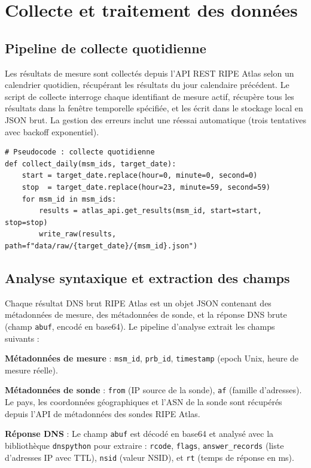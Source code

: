 \bigskip
\section{Collecte et traitement des données}
\label{sec:3.4}

\subsection{Pipeline de collecte quotidienne}
\label{subsec:3.4.1}

Les résultats de mesure sont collectés depuis l'API REST RIPE Atlas selon un calendrier quotidien, récupérant les résultats du jour calendaire précédent. Le script de collecte interroge chaque identifiant de mesure actif, récupère tous les résultats dans la fenêtre temporelle spécifiée, et les écrit dans le stockage local en JSON brut. La gestion des erreurs inclut une réessai automatique (trois tentatives avec backoff exponentiel).

\begin{lstlisting}[style=python]
# Pseudocode : collecte quotidienne
def collect_daily(msm_ids, target_date):
    start = target_date.replace(hour=0, minute=0, second=0)
    stop  = target_date.replace(hour=23, minute=59, second=59)
    for msm_id in msm_ids:
        results = atlas_api.get_results(msm_id, start=start, stop=stop)
        write_raw(results, path=f"data/raw/{target_date}/{msm_id}.json")
\end{lstlisting}

\subsection{Analyse syntaxique et extraction des champs}
\label{subsec:3.4.2}

Chaque résultat DNS brut RIPE Atlas est un objet JSON contenant des métadonnées de mesure, des métadonnées de sonde, et la réponse DNS brute (champ \texttt{abuf}, encodé en base64). Le pipeline d'analyse extrait les champs suivants :

\textbf{Métadonnées de mesure} : \texttt{msm\_id}, \texttt{prb\_id}, \texttt{timestamp} (epoch Unix, heure de mesure réelle).

\textbf{Métadonnées de sonde} : \texttt{from} (IP source de la sonde), \texttt{af} (famille d'adresses). Le pays, les coordonnées géographiques et l'ASN de la sonde sont récupérés depuis l'API de métadonnées des sondes RIPE Atlas.

\textbf{Réponse DNS} : Le champ \texttt{abuf} est décodé en base64 et analysé avec la bibliothèque \texttt{dnspython} pour extraire : \texttt{rcode}, \texttt{flags}, \texttt{answer\_records} (liste d'adresses IP avec TTL), \texttt{nsid} (valeur NSID), et \texttt{rt} (temps de réponse en ms).

